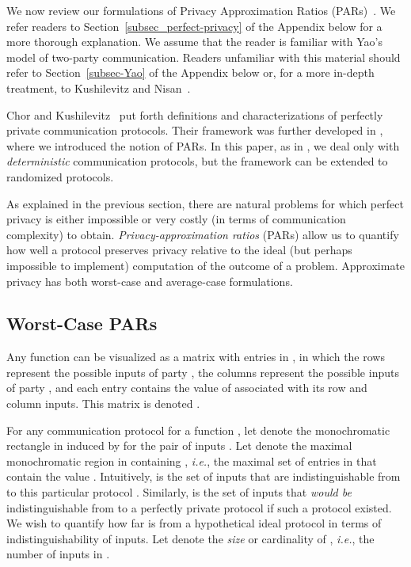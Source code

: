 \documentclass{article}
\theoremstyle{theorem}
\theoremstyle{definition}
\theoremstyle{remark}
\newcommand{\ie}{\emph{i.e.}}
\begin{document}
We now review our formulations of Privacy Approximation Ratios (PARs)~\cite{fjs09tr14}.
We refer readers to Section~\ref{subsec_perfect-privacy} of the Appendix below for a more
thorough explanation. We assume that the reader is familiar with Yao's model of two-party
communication. Readers unfamiliar with this material should refer to Section~\ref{subsec-Yao}
of the Appendix below or, for a more in-depth treatment, to Kushilevitz and Nisan~\cite{KN97}.

Chor and Kushilevitz~\cite{CK91,K92} put forth definitions and characterizations of perfectly
private communication protocols. Their framework was further developed in \cite{fjs09tr14},
where we introduced the notion of PARs. In this paper, as in \cite{fjs09tr14}, we deal only
with \emph{deterministic} communication protocols, but the framework can be extended to randomized
protocols.

As explained in the previous section, there are natural problems for which
perfect privacy is either impossible or very costly (in terms of communication complexity) to obtain.
\emph{Privacy-approximation ratios} (PARs) allow us to quantify how
well a protocol preserves privacy relative to the ideal (but perhaps impossible to implement)
computation of the outcome of a problem.  Approximate privacy has both worst-case and average-case
formulations.

\subsection{Worst-Case PARs}\label{ssec:par-wc}

Any function  can
be visualized as a  matrix with entries in
, in which the rows represent the possible inputs of
party , the columns represent the possible inputs of party ,
and each entry contains the value of  associated with its row and
column inputs. This matrix is denoted .

For any communication protocol  for a function , let
 denote the monochromatic rectangle in  induced by  for the pair
of inputs . Let  denote the maximal monochromatic region in 
containing , \emph{i.e.}, the maximal set of entries in  that contain
the value . Intuitively,  is the set
of inputs that are indistinguishable from  to this particular protocol .
Similarly,  is the set
of inputs that \emph{would be} indistinguishable from  to a
perfectly private protocol if such a protocol existed.
We wish to quantify how far  is from a hypothetical ideal protocol in
terms of indistinguishability of inputs. Let  denote the \emph{size} or
cardinality of , \ie, the number of inputs in .
\end{document}
